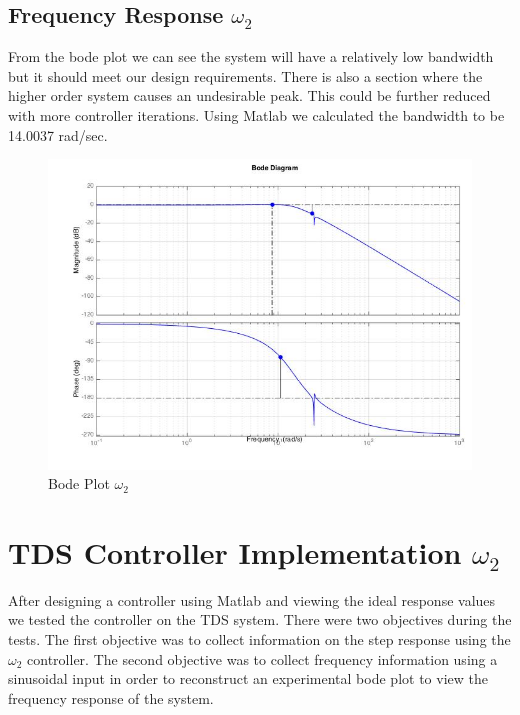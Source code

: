 \documentclass[11pt,titlepage]{article}
\begin{document}
	\subsection{Frequency Response $\omega_2$}
		From the bode plot we can see the system will have a relatively low bandwidth but it should meet our design requirements. There is also a section where the higher order system causes an undesirable peak. This could be further reduced with more controller iterations. Using Matlab we calculated the bandwidth to be 14.0037 rad/sec.
		\begin{figure}[H]
			\centering
			\includegraphics[scale=0.4]{bodew2}
			\caption{Bode Plot $\omega_2$}
		\end{figure}

\section{TDS Controller Implementation $\omega_2$}
	After designing a controller using Matlab and viewing the ideal response values we tested the controller on the TDS system. There were two objectives during the tests. The first objective was to collect information on the step response using the $\omega_2$ controller. The second objective was to collect frequency information using a sinusoidal input in order to reconstruct an experimental bode plot to view the frequency response of the system.
\end{document}
